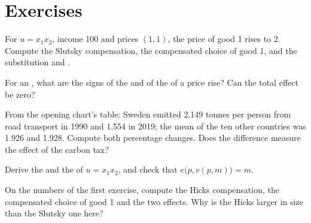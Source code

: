 \section*{Exercises}\label{sec:b1:income-and-substitution-effects:exercises}

\begin{exercise}[$\star$]\label{exo:b1:income-and-substitution-effects:slutsky-cd}
For $u = x_1x_2$, income 100 and prices $(1, 1)$, the price of good 1 rises to
2. Compute the Slutsky compensation, the compensated choice of good 1, and
the substitution and .
\end{exercise}

\begin{exercise}[$\star$]\label{exo:b1:income-and-substitution-effects:inferior}
For an , what are the signs of the  and of
the  of a price rise? Can the total effect be zero?
\end{exercise}

\begin{exercise}[$\star$]\label{exo:b1:income-and-substitution-effects:read}
From the opening chart's table: Sweden emitted 2.149 tonnes per person from
road transport in 1990 and 1.554 in 2019; the mean of the ten other
countries was 1.926 and 1.928. %
Compute both percentage changes. Does the difference measure the effect of
the carbon tax?
\end{exercise}

\begin{exercise}[$\star$]\label{exo:b1:income-and-substitution-effects:expenditure-cd}
Derive the  and the  of $u = x_1x_2$,
and check that $e\bigl(p, v(p, m)\bigr) = m$.
\end{exercise}

\begin{exercise}[$\star\star$]\label{exo:b1:income-and-substitution-effects:hicks}
On the numbers of the first exercise, compute the Hicks compensation, the
compensated choice of good 1 and the two effects. Why is the Hicks
 larger in size than the Slutsky one here?
\end{exercise}

